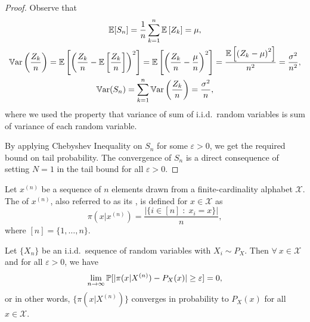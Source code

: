 \documentclass[11pt,a4paper]{article}
\begin{document}
\begin{proof}
    Observe that 
    \begin{gather*}
        \mathbb{E}[S_n] = \dfrac{1}{n}\sum_{k=1}^n \mathbb{E}\left[ Z_k \right] = \mu, \\
        \mathbb{V}\text{ar}\left(\dfrac{Z_k}{n}\right) = \mathbb{E}\left[\left( \dfrac{Z_k}{n} - \mathbb{E}\left[ \dfrac{Z_k}{n} \right]\right)^2 \right] = \mathbb{E}\left[\left( \dfrac{Z_k}{n} - \dfrac{\mu}{n} \right)^2\right] = \dfrac{\mathbb{E}\left[\left( Z_k - \mu \right)^2\right]}{n^2} = \dfrac{\sigma^2}{n^2}, \\
        \mathbb{V}\text{ar}(S_n) = \sum_{k=1}^{n} \mathbb{V}\text{ar}\left(\dfrac{Z_k}{n}\right) = \dfrac{\sigma^2}{n},
    \end{gather*}
    where we used the property that variance of sum of i.i.d.~random variables is sum of variance of each random variable.

    By applying Chebyshev Inequality on $S_n$ for some $\varepsilon > 0$, we get the required bound on tail probability. The convergence of $S_n$ is a direct consequence of setting $N = 1$ in the tail bound for all $\varepsilon > 0$.
\end{proof}

\begin{definition}[Type]
    Let $x^{(n)}$ be a sequence of $n$ elements drawn from a finite-cardinality alphabet $\mathcal{X}$. The  of $x^{(n)}$, also referred to as its , is defined for $x\in \mathcal{X}$ as
    \begin{equation*}
        \pi(x|x^{(n)}) = \dfrac{|\{i\in [n]\;:\;x_i = x\}|}{n}, 
    \end{equation*}
    where $[n] = \{1,\ldots, n\}$.
\end{definition}

\begin{theorem}
    Let $\{X_n\}$ be an i.i.d.~sequence of random variables with $X_i\sim P_X$. Then $\forall\ x\in\mathcal{X}$ and for all $\varepsilon>0$, we have
    \begin{equation*}
        \lim_{n\rightarrow \infty} \mathbb{P}[|\pi(x|X^{(n)}) - P_X(x)| \ge \varepsilon] = 0, 
    \end{equation*}
    or in other words, $\{\pi(x|X^{(n)})\}$ converges in probability to $P_X(x)$ for all $x\in\mathcal{X}$.
\end{theorem}
\end{document}
